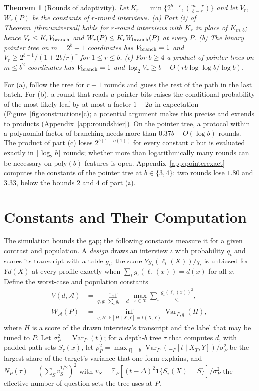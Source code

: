 \documentclass{article}
\newtheorem{theorem}{Theorem}
\newcommand{\E}{\mathbb{E}}
\newcommand{\Var}{\operatorname{Var}}
\newcommand{\X}{\mathcal X}
\newcommand{\A}{\mathcal A}
\begin{document}
\begin{theorem}[Rounds of adaptivity]\label{thm:rounds}
Let $K_r=\min\{2^{b-r},\binom{m-r}{b-r}\}$ and let $V_r$, $W_r(P)$ be the constants of $r$-round interviews.
\textup{(a)} Part \textup{(i)} of Theorem~\ref{thm:universal} holds for $r$-round interviews with $K_r$ in place of $K_{m,b}$; hence $V_r\le K_rV_{\rm branch}$ and $W_r(P)\le K_rW_{\rm branch}(P)$ at every $P$.
\textup{(b)} The binary pointer tree on $m=2^b-1$ coordinates has $V_{\rm branch}=1$ and $V_r\ge2^{b-1}/(1+2b/r)^{r}$ for $1\le r\le b$.
\textup{(c)} For $b\ge4$ a product of pointer trees on $m\le b^2$ coordinates has $V_{\rm branch}=1$ and $\log_2V_r\ge b-O(rb\log\log b/\log b)$.
\end{theorem}
For (a), follow the tree for $r-1$ rounds and guess the rest of the path in the last batch. For (b), a round that reads $a$ pointer bits raises the conditional probability of the most likely leaf by at most a factor $1+2a$ in expectation (Figure~\ref{fig:constructions}c); a potential argument makes this precise and extends to products (Appendix~\ref{app:roundshier}). On the pointer tree, a protocol within a polynomial factor of branching needs more than $0.37b-O(\log b)$ rounds. The product of part (c) loses $2^{b(1-o(1))}$ for every constant $r$ but is evaluated exactly in $\lfloor\log_2b\rfloor$ rounds; whether more than logarithmically many rounds can be necessary on $\mathrm{poly}(b)$ features is open. Appendix~\ref{app:pointerexact} computes the constants of the pointer tree at $b\in\{3,4\}$: two rounds lose $1.80$ and $3.33$, below the bounds $2$ and $4$ of part (a).

\section{Constants and Their Computation}\label{sec:general}\label{sec:population}
The simulation bounds the gap; the following constants measure it for a given contrast and population. A \emph{design} draws an interview $\iota$ with probability $q_\iota$ and scores its transcript with a table $g_\iota$; the score $Yg_\iota(\ell_\iota(X))/q_\iota$ is unbiased for $Yd(X)$ at every profile exactly when $\sum_\iota g_\iota(\ell_\iota(x))=d(x)$ for all $x$. Define the worst-case and population constants
\begin{align}
 V(d,\A)&=\inf_{q,g:\ \sum_\iota g_\iota=d}\ \max_{x\in\X}\sum_\iota\frac{g_\iota(\ell_\iota(x))^2}{q_\iota},\label{eq:unbiasedprogram}\\
 W_{\A}(P)&=\inf_{q,H:\,\E[H\mid X,Y]=t(X,Y)}\Var_{P,q}(H),\label{eq:mainW}
\end{align}
where $H$ is a score of the drawn interview's transcript and the label that may be tuned to $P$. Let $\sigma_P^2=\Var_P(t)$; for a depth-$b$ tree $\tau$ that computes $d$, with padded path sets $S_\tau(x)$, let $\rho_P^2=\max_{|T|=b}\Var_P(\E_P[t\mid X_T,Y])/\sigma_P^2$ be the largest share of the target's variance that one form explains, and $N_P(\tau)=(\sum_Sv_S^{1/2})^2$ with $v_S=\E_P[(t-\Delta)^2\mathbf 1\{S_\tau(X)=S\}]/\sigma_P^2$ the effective number of question sets the tree uses at $P$.
\end{document}

